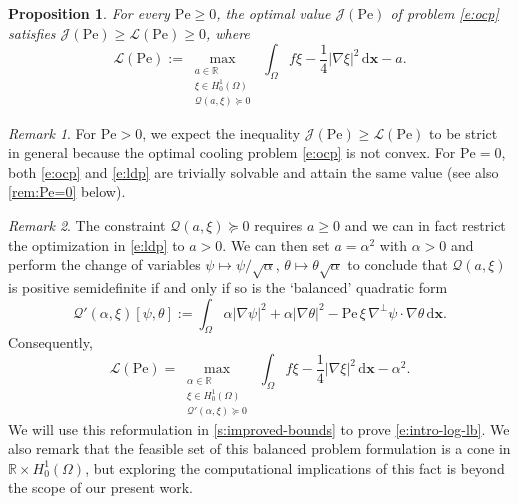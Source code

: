 \documentclass[a4paper, 10pt]{amsart}
\numberwithin{equation}{section}
\theoremstyle{plain}
\newtheorem{proposition}[theorem]{Proposition}
\theoremstyle{definition}
\theoremstyle{remark}
\newtheorem{remark}{Remark}[section]
\newcommand{\R}{\mathbb{R}}
\newcommand{\Pe}{\mathrm{Pe}}
\newcommand{\Hoz}{H_0^1(\Omega)}
\newcommand{\QF}{\mathcal{Q}}
\renewcommand{\vec}[1]{\mathbf{#1}}
\newcommand{\abs}[1]{\left\vert #1 \right\vert}
\newcommand{\dx}{\mathrm{d} \vec{x}}
\newcommand{\avg}[1]{\int_\Omega #1 \,\dx}
\newcommand{\ocpval}{\mathcal{J}}
\newcommand{\lb}{\mathcal{L}}
\begin{document}
\begin{proposition}\label{th:duality}
    For every $\Pe\geq 0$, 
    the optimal value $\ocpval(\Pe)$ of problem \cref{e:ocp} satisfies $\ocpval(\Pe) \geq \lb(\Pe) \geq 0$, where
    \begin{equation}\label{e:ldp}\tag{LDP}
        \lb(\Pe) := \max_{\substack{
            a\in \R \\ 
            \xi \in H^1_0(\Omega) \\ 
            \QF\left(a,\xi\right) \succeq  0 
        }}\;
        \avg{f\xi - \frac14 \abs{\nabla \xi}^2} - a.
    \end{equation}
\end{proposition}

\begin{remark}
    For $\Pe > 0$, we expect the inequality $\ocpval(\Pe) \geq \lb(\Pe)$ to be strict in general because the optimal cooling problem \cref{e:ocp} is not convex. For $\Pe=0$, both \cref{e:ocp} and \cref{e:ldp} are trivially solvable and attain the same value (see also \cref{rem:Pe=0} below).
\end{remark}

\begin{remark}\label{rem:symmetrization-1}
    The constraint $\QF\left(a,\xi\right) \succeq  0$ requires $a\geq 0$ and we can in fact restrict the optimization in \cref{e:ldp} to $a>0$. We can then set $a=\alpha^2$ with $\alpha > 0$ and perform the change of variables $\psi \mapsto \psi / \sqrt{\alpha}$, $\theta \mapsto \theta \sqrt{\alpha}$ to conclude that $\QF\left(a,\xi\right)$ is positive semidefinite if and only if so is the `balanced' quadratic form
    \begin{equation}\label{e:qf-symmetrized}
    \mathcal{Q}'\left(\alpha,\xi\right)[\psi,\theta] := \avg{ \alpha|\nabla \psi|^2 + \alpha\abs{\nabla\theta}^2 - \Pe\,\xi\, \nabla^\perp \psi \cdot \nabla \theta}.
    \end{equation}
    Consequently,
    \begin{equation*}
        \lb(\Pe) = \max_{\substack{
            \alpha \in \R \\ 
            \xi \in H^1_0(\Omega) \\ 
            \QF'\left(\alpha,\xi\right) \succeq  0 
        }}\;
        \avg{f\xi - \frac14 \abs{\nabla \xi}^2} - \alpha^2.
    \end{equation*}
    We will use this reformulation in \cref{s:improved-bounds} to prove \cref{e:intro-log-lb}. We also remark that the feasible set of this balanced problem formulation is a cone in $\R\times\Hoz$, but exploring the computational implications of this fact is beyond the scope of our present work.
\end{remark}
\end{document}
